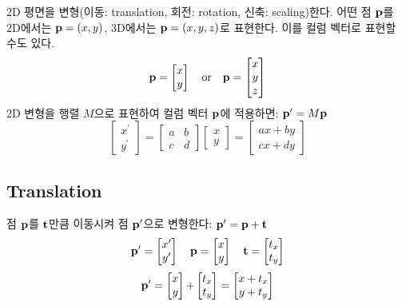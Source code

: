 2D 평면을 변형(이동: translation, 회전: rotation, 신축: scaling)한다. 어떤 점 $\bold{p}$를 2D에서는 $\bold{p} = (x, y)$, 3D에서는 $\bold{p} = (x, y, z)$로 표현한다. 이를 컬럼 벡터로 표현할 수도 있다.
$$
\bold{p} =
\begin{bmatrix}
  x \\
  y
\end{bmatrix}
\quad \text{or} \quad
\bold{p} =
\begin{bmatrix}
  x \\
  y \\
  z
\end{bmatrix}
$$
2D 변형을 행렬 $M$으로 표현하여 컬럼 벡터 $\bold{p}$에 적용하면: $\bold{p}^\prime = M\bold{p}$
$$
\begin{bmatrix}
  x^\prime \\
  y^\prime
\end{bmatrix}
{=}
\begin{bmatrix}
  a & b \\
  c & d
\end{bmatrix}
\begin{bmatrix}
  x \\
  y
\end{bmatrix}
{=}
\begin{bmatrix}
  ax + by \\
  cx + dy
\end{bmatrix}
$$

\subsection{Translation}

점 $\bold{p}$를 $\bold{t}$만큼 이동시켜 점 $\bold{p}^\prime$으로 변형한다: $\bold{p}^\prime = \bold{p} + \bold{t}$
$$
\bold{p}^\prime =
\begin{bmatrix}
  x^\prime \\
  y^\prime
\end{bmatrix}
\quad
\bold{p} =
\begin{bmatrix}
  x \\
  y
\end{bmatrix}
\quad
\bold{t} =
\begin{bmatrix}
  t_x \\
  t_y
\end{bmatrix}
$$
$$
\bold{p}^\prime =
\begin{bmatrix}
  x \\
  y
\end{bmatrix}
{+}
\begin{bmatrix}
  t_x \\
  t_y
\end{bmatrix}
=
\begin{bmatrix}
  x + t_x \\
  y + t_y
\end{bmatrix}
$$

